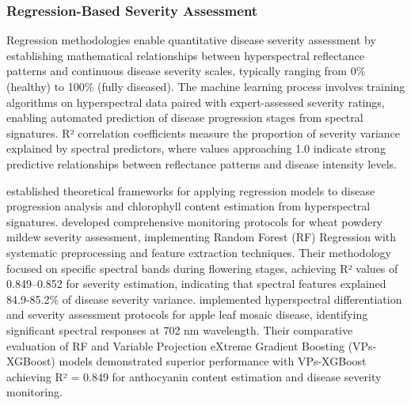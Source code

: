 \documentclass[sn-mathphys]{sn-jnl}
\theoremstyle{thmstyleone}%
\theoremstyle{thmstyletwo}%
\theoremstyle{thmstylethree}%
\begin{document}
\subsubsection{Regression-Based Severity Assessment}
Regression methodologies enable quantitative disease severity assessment by establishing mathematical relationships between hyperspectral reflectance patterns and continuous disease severity scales, typically ranging from 0\% (healthy) to 100\% (fully diseased). The machine learning process involves training algorithms on hyperspectral data paired with expert-assessed severity ratings, enabling automated prediction of disease progression stages from spectral signatures. R² correlation coefficients measure the proportion of severity variance explained by spectral predictors, where values approaching 1.0 indicate strong predictive relationships between reflectance patterns and disease intensity levels.

\citet{lu2019evaluating} established theoretical frameworks for applying regression models to disease progression analysis and chlorophyll content estimation from hyperspectral signatures. \citet{feng2022hyperspectral} developed comprehensive monitoring protocols for wheat powdery mildew severity assessment, implementing Random Forest (RF) Regression with systematic preprocessing and feature extraction techniques. Their methodology focused on specific spectral bands during flowering stages, achieving R² values of 0.849–0.852 for severity estimation, indicating that spectral features explained 84.9-85.2\% of disease severity variance. \citet{jiang2023monitoring} implemented hyperspectral differentiation and severity assessment protocols for apple leaf mosaic disease, identifying significant spectral responses at 702 nm wavelength. Their comparative evaluation of RF and Variable Projection eXtreme Gradient Boosting (VPs-XGBoost) models demonstrated superior performance with VPs-XGBoost achieving R² = 0.849 for anthocyanin content estimation and disease severity monitoring.
\end{document}
